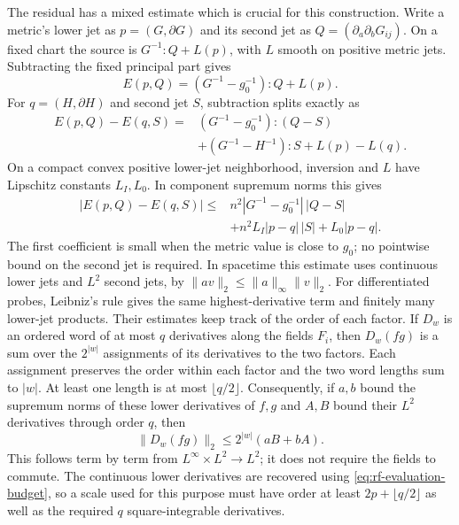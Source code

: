 The residual has a mixed estimate which is crucial for this construction.
Write a metric's lower jet as $p=(G,\partial G)$ and its second jet as
$Q=(\partial_a\partial_bG_{ij})$.  On a fixed chart the source is
$G^{-1}:Q+L(p)$, with $L$ smooth on positive metric jets.  Subtracting
the fixed principal part gives
\[
 E(p,Q)=(G^{-1}-g_0^{-1}):Q+L(p).
\]
For $q=(H,\partial H)$ and second jet $S$, subtraction splits exactly as
\[
\begin{split}
 E(p,Q)-E(q,S)
 ={}&(G^{-1}-g_0^{-1}):(Q-S)\\
    &+(G^{-1}-H^{-1}):S+L(p)-L(q).
\end{split}
\]
On a compact convex positive lower-jet neighborhood, inversion and $L$
have Lipschitz constants $L_I,L_0$.  In component supremum norms this gives
\[
\begin{split}
 |E(p,Q)-E(q,S)|\leq{}&n^2|G^{-1}-g_0^{-1}|\,|Q-S|\\
 &+n^2L_I|p-q|\,|S|+L_0|p-q|.
\end{split}
\]
The first coefficient is small when the metric value is close to $g_0$;
no pointwise bound on the second jet is required.  In spacetime this
estimate uses continuous lower jets and $L^2$ second jets, by
$\|av\|_2\leq\|a\|_\infty\|v\|_2$.
For differentiated probes, Leibniz's rule gives the same highest-derivative
term and finitely many lower-jet products.  Their estimates keep track
of the order of each factor.  If $D_w$ is an ordered word of at most
$q$ derivatives along the fields $F_i$, then $D_w(fg)$ is a sum over
the $2^{|w|}$ assignments of its derivatives to the two factors.  Each
assignment preserves the order within each factor and the two word
lengths sum to $|w|$.  At least one length is at most $\lfloor q/2\rfloor$.
Consequently, if $a,b$ bound the supremum norms of these lower derivatives
of $f,g$ and $A,B$ bound their $L^2$ derivatives through order $q$, then
\[
 \|D_w(fg)\|_2\leq 2^{|w|}(aB+bA).
\]
This follows term by term from $L^\infty\times L^2\to L^2$; it does
not require the fields to commute.  The continuous lower derivatives
are recovered using \eqref{eq:rf-evaluation-budget}, so a scale used for
this purpose must have order at least $2p+\lfloor q/2\rfloor$ as well
as the required $q$ square-integrable derivatives.


